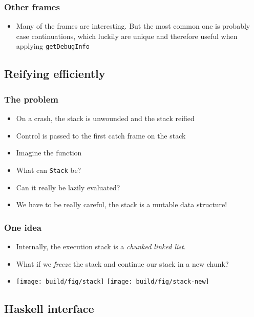 \documentclass[11pt]{beamer} %
\begin{document}
  \begin{frame}
   \frametitle{Other frames}
  \begin{itemize}
   \item <1-> Many of the frames are interesting. But the most common one is
     probably case continuations, which luckily are unique and therefore useful
     when applying \texttt{getDebugInfo}
  \end{itemize}
  \end{frame}

\subsection{Reifying efficiently}

  \begin{frame}
   \frametitle{The problem}
  \begin{itemize}
   \item <1-> On a crash, the stack is unwounded and the stack reified
   \item <1-> Control is passed to the first catch frame on the stack
   \item <2-> Imagine the function 
     \catchWithStackCode
   \item <2-> What can \texttt{Stack} be?
   \item <2-> Can it really be lazily evaluated?
   \item <3-> We have to be really careful, the stack is a mutable data structure!
  \end{itemize}
  \end{frame}

  \begin{frame}
   \frametitle{One idea}
  \begin{itemize}
   \item <1-> Internally, the execution stack is a \emph{chunked linked list}.
   \item <1-> What if we \emph{freeze} the stack and continue our stack in a new chunk?
   \item <2->
     \texttt{[image: build/fig/stack]}
     \texttt{[image: build/fig/stack-new]}
  \end{itemize}
  \end{frame}

\subsection{Haskell interface}
\end{document}
